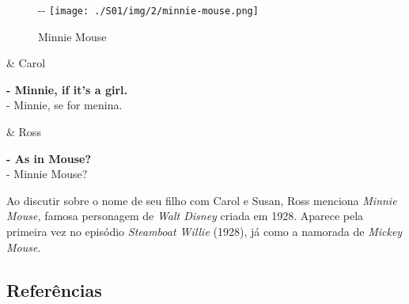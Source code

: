 \begin{figure}[!ht]
  \begin{adjustwidth}{-\oddsidemargin-1in}{-\rightmargin}
    \centering
    \texttt{[image: ./S01/img/2/minnie-mouse.png]}
    \caption{Minnie Mouse\label{fig:minnie-mouse}}
  \end{adjustwidth}
\end{figure}

\begin{tcolorbox}[enhanced,center upper,
    drop fuzzy shadow southeast, boxrule=0.3pt,
    lower separated=false,
    colframe=black!30!dialogoBorder,colback=white]
\begin{minipage}[c]{0.16\linewidth}
   & \centering \scriptsize{Carol}
\end{minipage}
\hfill
\begin{minipage}[c]{0.8\linewidth}
  \textbf{- Minnie, if it's a girl.}\\
  - Minnie, se for menina.
\end{minipage}

\medskip
\begin{minipage}[c]{0.16\linewidth}
   & \centering \scriptsize{Ross}
\end{minipage}
\hfill
\begin{minipage}[c]{0.8\linewidth}
  \textbf{- As in Mouse?}\\
  - Minnie Mouse?
\end{minipage}
\end{tcolorbox}

Ao discutir sobre o nome de seu filho com Carol e Susan, Ross menciona
\emph{Minnie Mouse,} famosa personagem de \emph{Walt Disney} criada em
1928. Aparece pela primeira vez no episódio \emph{Steamboat Willie}
(1928), já como a namorada de \emph{Mickey Mouse}.

\hypertarget{referuxeancias-4}{%
\subsection{Referências}\label{referuxeancias-4}}

